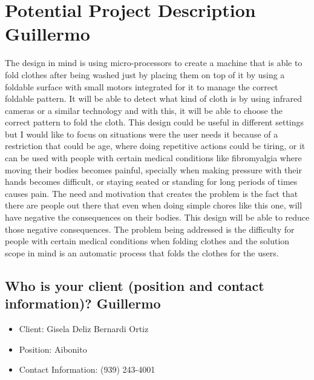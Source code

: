 \chapter{Potential Project Description Guillermo}

The design in mind is using micro-processors to create a machine that is able to fold clothes after being washed just by placing them on top of it by using a foldable surface with small motors integrated for it to manage the correct foldable pattern. It will be able to detect what kind of cloth is by using infrared cameras or a similar technology and with this, it will be able to choose the correct pattern to fold the cloth.  This design could be useful in different settings but I would like to focus on situations were the user needs it because of a restriction that could be age, where doing repetitive actions could be tiring, or it can be used with people with certain medical conditions like fibromyalgia where moving their bodies becomes painful, specially when making pressure with their hands becomes difficult, or staying seated or standing for long periods of times causes pain. The need  and motivation that creates the problem is the fact that there are people out there that even when doing simple chores like this one, will have negative the consequences on their bodies. This design will be able to reduce those negative consequences. The problem being addressed is the difficulty for people with certain medical conditions when folding clothes and the solution scope in mind is an automatic process that folds the clothes for the users.

\newpage
\section{Who is your client (position and contact information)? Guillermo}
\begin{itemize}
\item Client: Gisela Deliz Bernardi Ortiz
\item Position: Aibonito
\item Contact Information: (939) 243-4001
\end{itemize}
